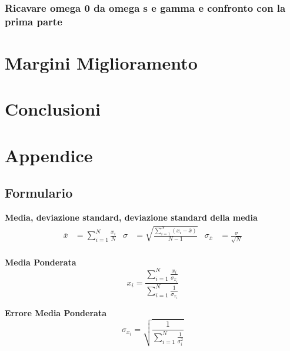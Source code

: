 \documentclass[a4paper,11pt,oneside]{article}
\begin{document}
\subsubsection{Ricavare omega 0 da omega s e gamma e confronto con la prima parte}












\section{Margini Miglioramento}
\section{Conclusioni}
\section{Appendice}
\subsection{Formulario}
\textbf{Media, deviazione standard, deviazione standard della media}
\begin{align*}
        \overline{x}&=\sum\limits_{i=1}^{N} \frac{x_{i}}{N}&
        \sigma&=\sqrt{\frac{\sum\limits_{i=1}^{N} (x_{i}-\overline{x})}{N-1}}&
        \sigma_{\overline{x}}&=\frac{\sigma}{\sqrt{N}}
\end{align*}\\

\textbf{Media Ponderata}
\begin{equation*}
\label{eq:media_pond}
    x_i=\frac{\sum_{i=1}^{N}\frac{x_i}{\sigma_{x_i}}}{\sum_{i=1}^{N}\frac{1}{\sigma_{x_i}}}
\end{equation*}

\textbf{Errore Media Ponderata}
\begin{equation*}
\label{eq:errore_media_pond}
     \sigma_{x_i}=\sqrt{\frac{1}{\sum_{i=1}^{N}\frac{1}{\sigma_{i}^{2}}}}
\end{equation*}
\end{document}
